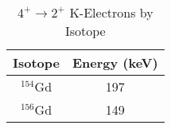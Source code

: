 \begin{table}[]
    \centering
    \caption{$4^+\rightarrow2^+$ K-Electrons by Isotope}
    \begin{tabular}{c|c}
    \toprule
         Isotope & Energy (keV) \\
         \hline
         $^{154}$Gd & 197 \\
         $^{156}$Gd & 149 \\
         \bottomrule
    \end{tabular}
    \label{tab:neutron_electron}
\end{table}
